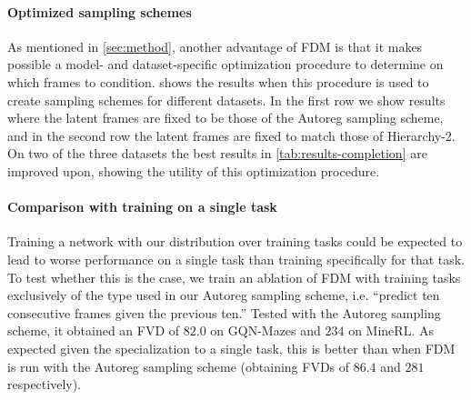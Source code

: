 \paragraph{Optimized sampling schemes}
As mentioned in \cref{sec:method}, another advantage of FDM is that it makes possible a model- and dataset-specific optimization procedure to determine on which frames to condition.  shows the results when this procedure is used to create sampling schemes for different datasets. In the first row we show results where the latent frames are fixed to be those of the Autoreg sampling scheme, and in the second row the latent frames are fixed to match those of Hierarchy-2. On two of the three datasets the best results in \cref{tab:results-completion} are improved upon, showing the utility of this optimization procedure.

\paragraph{Comparison with training on a single task}
Training a network with our distribution over training tasks could be expected to lead to worse performance on a single task than training specifically for that task. To test whether this is the case, we train an ablation of FDM with training tasks exclusively of the type used in our Autoreg sampling scheme, i.e. ``predict ten consecutive frames given the previous ten.'' Tested with the Autoreg sampling scheme, it obtained an FVD of $82.0$ on GQN-Mazes and $234$ on MineRL. As expected given the specialization to a single task, this is better than when FDM is run with the Autoreg sampling scheme (obtaining FVDs of $86.4$ and $281$ respectively).

